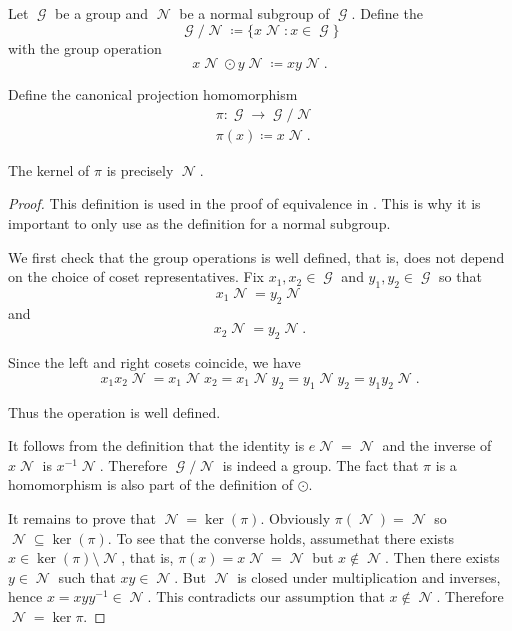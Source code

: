 \begin{definition}\label{def:quotient_group}
  Let \( \mscrG \) be a group and \( \mscrN \) be a normal subgroup of \( \mscrG \). Define the 
  \begin{equation*}
    \mscrG / \mscrN \coloneqq \{ x \mscrN \colon x \in \mscrG \}
  \end{equation*}
  with the group operation
  \begin{equation*}
    x \mscrN \odot y \mscrN \coloneqq xy \mscrN.
  \end{equation*}

  Define the canonical projection homomorphism
  \begin{align*}
    &\pi: \mscrG \to \mscrG / \mscrN \\
    &\pi(x) \coloneqq x \mscrN.
  \end{align*}

  The kernel of \( \pi \) is precisely \( \mscrN \).
\end{definition}
\begin{proof}
  This definition is used in the proof of equivalence in . This is why it is important to only use  as the definition for a normal subgroup.

  We first check that the group operations is well defined, that is, does not depend on the choice of coset representatives. Fix \( x_1, x_2 \in \mscrG \) and \( y_1, y_2 \in \mscrG \) so that
  \begin{equation*}
    x_1 \mscrN = y_2 \mscrN
  \end{equation*}
  and
  \begin{equation*}
    x_2 \mscrN = y_2 \mscrN.
  \end{equation*}

  Since the left and right cosets coincide, we have
  \begin{equation*}
    x_1 x_2 \mscrN = x_1 \mscrN x_2 = x_1 \mscrN y_2 = y_1 \mscrN y_2 = y_1 y_2 \mscrN.
  \end{equation*}

  Thus the operation is well defined.

  It follows from the definition that the identity is \( e \mscrN = \mscrN \) and the inverse of \( x \mscrN \) is \( x^{-1} \mscrN \). Therefore \( \mscrG / \mscrN \) is indeed a group. The fact that \( \pi \) is a homomorphism is also part of the definition of \( \odot \).

  It remains to prove that \( \mscrN = \ker(\pi) \). Obviously \( \pi(\mscrN) = \mscrN \) so \( \mscrN \subseteq \ker(\pi) \). To see that the converse holds, assume\LEM that there exists \( x \in \ker(\pi) \setminus \mscrN \), that is, \( \pi(x) = x\mscrN = \mscrN \) but \( x \not\in \mscrN \). Then there exists \( y \in \mscrN \) such that \( xy \in \mscrN \). But \( \mscrN \) is closed under multiplication and inverses, hence \( x = xyy^{-1} \in \mscrN \). This contradicts our assumption that \( x \not\in \mscrN \). Therefore \( \mscrN = \ker \pi \).
\end{proof}

